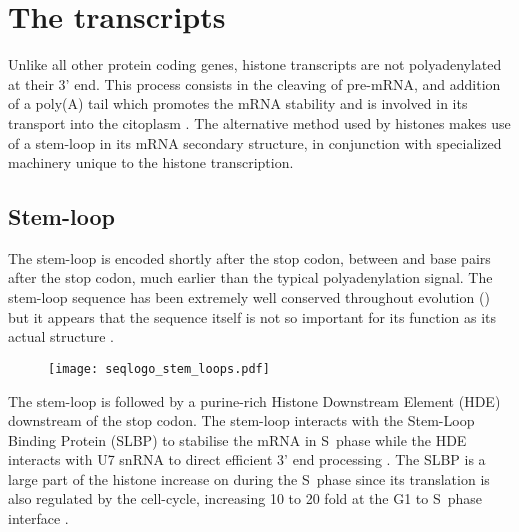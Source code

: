 \section{The transcripts}

  Unlike all other protein coding genes, histone transcripts are not polyadenylated at
  their 3' end. This process consists in the cleaving of pre-mRNA, and addition of a
  poly(A) tail which promotes the mRNA stability and is involved in its transport
  into the citoplasm \citep{mRNA-end-processing}. The alternative method used by
  histones makes use of a stem-loop in its mRNA secondary structure, in conjunction
  with specialized machinery unique to the histone transcription.


  \subsection{Stem-loop}
    The stem-loop is encoded shortly after the stop codon, between \StemLoopStart{} and
    \StemLoopEnd{} base pairs after the stop codon, much earlier than the typical
    polyadenylation signal. The stem-loop sequence has been extremely well conserved
    throughout evolution () but it appears that the
    sequence itself is not so important for its function as its actual structure
    \citep{stem-loop-structure}.

    \begin{figure}
      \centering
      \texttt{[image: seqlogo\_stem\_loops.pdf]}
      \label{fig:stem-loop-seqlogo}
    \end{figure}

    The stem-loop is followed by a purine-rich Histone Downstream Element (HDE)
    downstream of the stop codon. The stem-loop interacts with the Stem-Loop
    Binding Protein (SLBP) to stabilise the mRNA in S~phase \citep{SLBP-regulation}
    while the HDE interacts with U7 snRNA to direct efficient 3' end processing
    \citep{HDE-sequence}. The SLBP is a large part of the histone increase on
    during the S~phase since its translation is also regulated
    by the cell-cycle, increasing 10 to 20 fold at the G1 to S~phase
    interface \citep{SLBP-regulation}.

